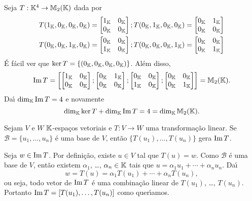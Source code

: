 \begin{exemplo}
	Seja $T : \mathbb{K}^4 \to \mathbb{M}_2(\mathbb{K})$ dada por
	\begin{align*}
		T(1_{\mathbb{K}},0_{\mathbb{K}},0_{\mathbb{K}},0_{\mathbb{K}}) &= \begin{bmatrix}
			1_{\mathbb{K}} & 0_{\mathbb{K}}\\
			0_{\mathbb{K}} & 0_{\mathbb{K}}
		\end{bmatrix}; T(0_{\mathbb{K}},1_{\mathbb{K}},0_{\mathbb{K}},0_{\mathbb{K}}) = \begin{bmatrix}
			0_{\mathbb{K}} & 1_{\mathbb{K}}\\
			0_{\mathbb{K}} & 0_{\mathbb{K}}
		\end{bmatrix}\\
		T(0_{\mathbb{K}},0_{\mathbb{K}},1_{\mathbb{K}},0_{\mathbb{K}}) &= \begin{bmatrix}
			0_{\mathbb{K}} & 0_{\mathbb{K}}\\
			1_{\mathbb{K}} & 0_{\mathbb{K}}
		\end{bmatrix}; T(0_{\mathbb{K}},0_{\mathbb{K}},0_{\mathbb{K}},1_{\mathbb{K}}) = \begin{bmatrix}
			0_{\mathbb{K}} & 0_{\mathbb{K}}\\
			0_{\mathbb{K}} & 1_{\mathbb{K}}
		\end{bmatrix}\\
	\end{align*}
	\'E f\'acil ver que $\ker T = \{(0_{\mathbb{K}},0_{\mathbb{K}},0_{\mathbb{K}},0_{\mathbb{K}})\}$. Al\'em disso,
	\[
		{\rm Im\,} T = \left[\begin{bmatrix}
			1_{\mathbb{K}} & 0_{\mathbb{K}}\\
			0_{\mathbb{K}} & 0_{\mathbb{K}}
		\end{bmatrix};\begin{bmatrix}
			0_{\mathbb{K}} & 1_{\mathbb{K}}\\
			0_{\mathbb{K}} & 0_{\mathbb{K}}
		\end{bmatrix};\begin{bmatrix}
			0_{\mathbb{K}} & 0_{\mathbb{K}}\\
			1_{\mathbb{K}} & 0_{\mathbb{K}}
		\end{bmatrix};\begin{bmatrix}
			0_{\mathbb{K}} & 0_{\mathbb{K}}\\
			0_{\mathbb{K}} & 1_{\mathbb{K}}
		\end{bmatrix}\right] = \mathbb{M}_2(\mathbb{K}).
	\]
	Da{\'\i} $\dim_{\mathbb{K}}{\rm Im\,} T = 4$ e novamente
	\[
		\dim_{\mathbb{K}}\ker T + \dim_{\mathbb{K}}{\rm Im\,} T = 4 = \dim_{\mathbb{K}}\mathbb{M}_2(\mathbb{K}).
	\]
\end{exemplo}

\begin{lema}\label{transformacao_gera_imagem}
	Sejam $V$ e $W$ $\mathbb{K}$-espa\c{c}os vetoriais e $T : V \to W$ uma transforma\c{c}\~ao linear. Se $\mathcal{B} = \{u_1, \dots, u_n\}$ \'e uma base de $V$, ent\~ao $\{T(u_1), \dots, T(u_n)\}$ gera ${\rm Im\,} T$.
\end{lema}
\begin{prova}
	Seja $w \in {\rm Im\,} T$. Por defini\c{c}\~ao, existe $u \in V$ tal que $T(u) = w$. Como $\mathcal{B}$ \'e uma base de $V$, ent\~ao existem $\alpha_1$, \dots, $\alpha_n \in \mathbb{K}$ tais que $u = \alpha_1u_1 + \cdots + \alpha_nu_n$. Da{\'\i}
	\[
		w = T(u) = \alpha_1T(u_1) + \cdots + \alpha_nT(u_n),
	\]
	ou seja, todo vetor de ${\rm Im\,} T$ \'e uma combina\c{c}\~ao linear de $T(u_1)$, \dots, $T(u_n)$. Portanto ${\rm Im\,} T = [T(u_1), \dots, T(u_n)]$ como quer{\'\i}amos.
\end{prova}

